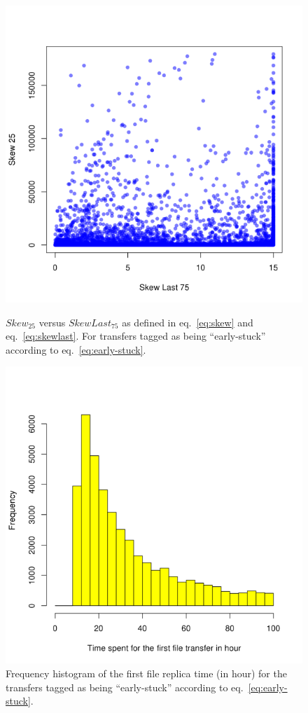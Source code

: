 \begin{figure}[htp]
\centering
\includegraphics{Figures/figure-72.pdf}
\caption{$Skew_{25}$ versus $SkewLast_{75}$ as defined in
  eq.~\ref{eq:skew} and eq.~\ref{eq:skewlast}. For transfers tagged as
  being ``early-stuck'' according to
  eq.~\ref{eq:early-stuck}.}\label{fig:figure-7.2}
\includegraphics{Figures/figure-71.pdf}
\caption{Frequency histogram of the first file replica time (in hour)
  for the transfers tagged as being ``early-stuck'' according to
  eq.~\ref{eq:early-stuck}.}\label{fig:figure-7.1}
\end{figure}

